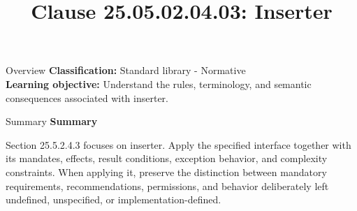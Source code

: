 \documentclass[10pt,letterpaper]{article}
\title{Clause 25.05.02.04.03: Inserter}
\author{}
\date{}
\begin{document}
\maketitle
\begin{CornellOverviewBox}{Overview}
\textbf{Classification:} Standard library - Normative\\[2pt]
\textbf{Learning objective:} Understand the rules, terminology, and semantic consequences associated with inserter.
\end{CornellOverviewBox}\begin{CornellSummaryBox}{Summary}
{\sffamily\bfseries\color{Accent} Summary}\par\vspace{3pt}Section 25.5.2.4.3 focuses on inserter. Apply the specified interface together with its mandates, effects, result conditions, exception behavior, and complexity constraints. When applying it, preserve the distinction between mandatory requirements, recommendations, permissions, and behavior deliberately left undefined, unspecified, or implementation-defined.
\end{CornellSummaryBox}
\end{document}

